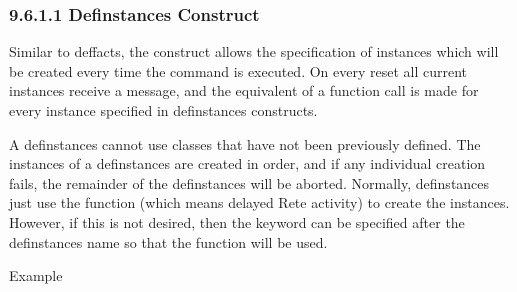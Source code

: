 \documentclass[letterpaper,10pt,english]{sphinxmanual}
\begin{document}
\subsubsection{9.6.1.1 Definstances Construct}
\label{\detokenize{cool:definstances-construct}}
Similar to deffacts, the  construct allows the
specification of instances which will be created every time the
 command is executed. On every reset all current instances
receive a  message, and the equivalent of a 
function call is made for every instance specified in definstances
constructs.


\begin{sphinxVerbatim}[commandchars=\\\{\}]
  \PYG{p}{[}\PYG{p}{]} \PYG{p}{[}\PYG{p}{]} 

  
\end{sphinxVerbatim}

A definstances cannot use classes that have not been previously defined.
The instances of a definstances are created in order, and if any
individual creation fails, the remainder of the definstances will be
aborted. Normally, definstances just use the  function
(which means delayed Rete activity) to create the instances. However, if
this is not desired, then the  keyword can be specified after
the definstances name so that the  function will
be used.

Example
\end{document}

